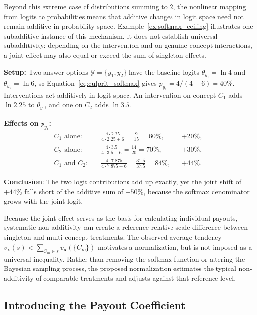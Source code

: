 Beyond this extreme case of distributions summing to $2$, the nonlinear mapping from logits to probabilities means that additive changes in logit space need not remain additive in probability space. Example~\ref{ex:softmax_ceiling} illustrates one subadditive instance of this mechanism. It does not establish universal subadditivity: depending on the intervention and on genuine concept interactions, a joint effect may also equal or exceed the sum of singleton effects.

\begin{example_box}[label=ex:softmax_ceiling]
	\textbf{Setup:} Two answer options $\mathcal{Y}=\{y_1,y_2\}$ have the baseline logits $\theta_{y_1}=\ln 4$ and $\theta_{y_2}=\ln 6$, so Equation~\ref{eq:culprit_softmax} gives $p_{y_1}=4/(4+6)=40\%$. Interventions act additively in logit space. An intervention on concept $C_1$ adds $\ln 2.25$ to $\theta_{y_1}$, and one on $C_2$ adds $\ln 3.5$.

	\smallskip
	\textbf{Effects on $p_{y_1}$:}
	\begin{align*}
		C_1 \text{ alone:}    & \quad \tfrac{4\cdot 2.25}{4\cdot 2.25+6}=\tfrac{9}{15}=60\%,        &  & +20\%, \\
		C_2 \text{ alone:}    & \quad \tfrac{4\cdot 3.5}{4\cdot 3.5+6}=\tfrac{14}{20}=70\%,         &  & +30\%, \\
		C_1 \text{ and } C_2: & \quad \tfrac{4\cdot 7.875}{4\cdot 7.875+6}=\tfrac{31.5}{37.5}=84\%, &  & +44\%.
	\end{align*}

	\textbf{Conclusion:} The two logit contributions add up exactly, yet the joint shift of $+44\%$ falls short of the additive sum of $+50\%$, because the softmax denominator grows with the joint logit.
\end{example_box}

Because the joint effect serves as the basis for calculating individual payouts, systematic non-additivity can create a reference-relative scale difference between singleton and multi-concept treatments. The observed average tendency $v_{\mathbf{x}}(s)<\sum_{C_m\in s}v_{\mathbf{x}}(\{C_m\})$ motivates a normalization, but is not imposed as a universal inequality. Rather than removing the softmax function or altering the Bayesian sampling process, the proposed normalization estimates the typical non-additivity of comparable treatments and adjusts against that reference level.

\subsection{Introducing the Payout Coefficient}

